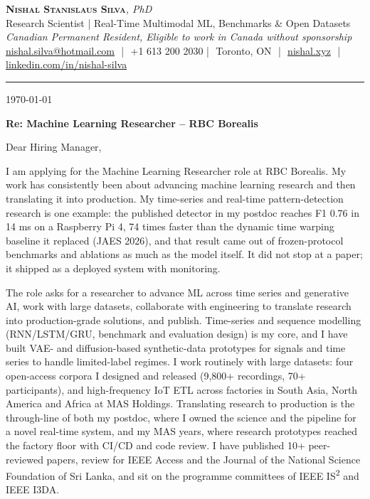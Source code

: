 \documentclass[11pt]{article}
\makeatletter
\newcommand{\clName}{Nishal Stanislaus Silva}
\newcommand{\clEmail}{nishal.silva@hotmail.com}
\newcommand{\clPhone}{+1 613 200 2030}
\newcommand{\clCity}{Toronto, ON}
\newcommand{\clSite}{https://nishal.xyz}
\newcommand{\clLinkedIn}{https://www.linkedin.com/in/nishal-silva}
\newcommand{\clStatus}{Canadian Permanent Resident, Eligible to work in Canada without sponsorship}
\newcommand{\clTagline}{Research Scientist | Real-Time Multimodal ML, Benchmarks \& Open Datasets}
\newcommand{\clRole}{Machine Learning Researcher}
\newcommand{\clCompany}{RBC Borealis}
\newcommand{\clAddressee}{Dear Hiring Manager,}
\makeatother
\begin{document}
\pagestyle{empty}
\begin{center}
    {\LARGE \scshape \textbf{\clName}}{\large \textit{, PhD}}\\[1pt]
    {\small \clTagline}\\[1pt]
    {\footnotesize\textit{\clStatus}}\\[1pt]
    {\small
    \href{mailto:\clEmail}{\clEmail} \,\,|\,\, \clPhone \,\,|\,\, \clCity
    \,\,|\,\, \href{\clSite}{nishal.xyz} \,\,|\,\, \href{\clLinkedIn}{linkedin.com/in/nishal-silva}}
\end{center}

\rule{\linewidth}{0.4pt}\vspace{0.6em}

\today

\textbf{Re: \clRole{} -- \clCompany{}}

\clAddressee

I am applying for the Machine Learning Researcher role at RBC Borealis. My work has consistently been about advancing machine learning research and then translating it into production. My time-series and real-time pattern-detection research is one example: the published detector in my postdoc reaches F1 0.76 in 14 ms on a Raspberry Pi 4, 74 times faster than the dynamic time warping baseline it replaced (JAES 2026), and that result came out of frozen-protocol benchmarks and ablations as much as the model itself. It did not stop at a paper; it shipped as a deployed system with monitoring.

The role asks for a researcher to advance ML across time series and generative AI, work with large datasets, collaborate with engineering to translate research into production-grade solutions, and publish. Time-series and sequence modelling (RNN/LSTM/GRU, benchmark and evaluation design) is my core, and I have built VAE- and diffusion-based synthetic-data prototypes for signals and time series to handle limited-label regimes. I work routinely with large datasets: four open-access corpora I designed and released (9,800+ recordings, 70+ participants), and high-frequency IoT ETL across factories in South Asia, North America and Africa at MAS Holdings. Translating research to production is the through-line of both my postdoc, where I owned the science and the pipeline for a novel real-time system, and my MAS years, where research prototypes reached the factory floor with CI/CD and code review. I have published 10+ peer-reviewed papers, review for IEEE Access and the Journal of the National Science Foundation of Sri Lanka, and sit on the programme committees of IEEE IS\textsuperscript{2} and IEEE I3DA.
\end{document}
